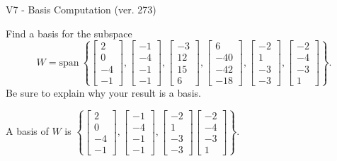 \begin{exercise}
  \begin{exerciseTitle}V7 - Basis Computation (ver. 273)\end{exerciseTitle}
  \begin{exerciseStatement}
    Find a basis for the subspace 
\[W=\mathrm{span}\ \left\{\left[\begin{array}{r}
2 \\
0 \\
-4 \\
-1
\end{array}\right] , \left[\begin{array}{r}
-1 \\
-4 \\
-1 \\
-1
\end{array}\right] , \left[\begin{array}{r}
-3 \\
12 \\
15 \\
6
\end{array}\right] , \left[\begin{array}{r}
6 \\
-40 \\
-42 \\
-18
\end{array}\right] , \left[\begin{array}{r}
-2 \\
1 \\
-3 \\
-3
\end{array}\right] , \left[\begin{array}{r}
-2 \\
-4 \\
-3 \\
1
\end{array}\right]\right\}.\]
 Be sure to explain why your result is a basis.


  \end{exerciseStatement}
  \begin{exerciseAnswer}
   A basis of \(W\) is  \(\left\{\left[\begin{array}{r}
2 \\
0 \\
-4 \\
-1
\end{array}\right] , \left[\begin{array}{r}
-1 \\
-4 \\
-1 \\
-1
\end{array}\right] , \left[\begin{array}{r}
-2 \\
1 \\
-3 \\
-3
\end{array}\right] \left[\begin{array}{r}
-2 \\
-4 \\
-3 \\
1
\end{array}\right]\right\}\).
  


  \end{exerciseAnswer}
\end{exercise}